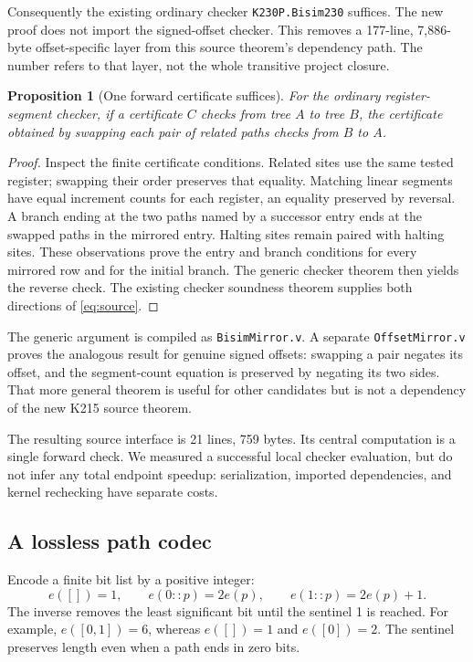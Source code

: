 \documentclass[11pt]{article}
\newtheorem{proposition}[theorem]{Proposition}
\theoremstyle{remark}\newtheorem{remark}[theorem]{Remark}
\newcommand{\code}[1]{\texttt{\small #1}}
\begin{document}
Consequently the existing ordinary checker \code{K230P.Bisim230} suffices. The new proof does not import the signed-offset checker. This removes a 177-line, 7,886-byte offset-specific layer from this source theorem's dependency path. The number refers to that layer, not the whole transitive project closure.

\begin{proposition}[One forward certificate suffices]
For the ordinary register-segment checker, if a certificate $C$ checks from tree $A$ to tree $B$, the certificate obtained by swapping each pair of related paths checks from $B$ to $A$.
\end{proposition}
\begin{proof}
Inspect the finite certificate conditions. Related sites use the same tested register; swapping their order preserves that equality. Matching linear segments have equal increment counts for each register, an equality preserved by reversal. A branch ending at the two paths named by a successor entry ends at the swapped paths in the mirrored entry. Halting sites remain paired with halting sites. These observations prove the entry and branch conditions for every mirrored row and for the initial branch. The generic checker theorem then yields the reverse check. The existing checker soundness theorem supplies both directions of \eqref{eq:source}.
\end{proof}

The generic argument is compiled as \code{BisimMirror.v}. A separate \code{OffsetMirror.v} proves the analogous result for genuine signed offsets: swapping a pair negates its offset, and the segment-count equation is preserved by negating its two sides. That more general theorem is useful for other candidates but is not a dependency of the new K215 source theorem.

The resulting source interface is 21 lines, 759 bytes. Its central computation is a single forward check. We measured a successful local checker evaluation, but do not infer any total endpoint speedup: serialization, imported dependencies, and kernel rechecking have separate costs.

\subsection{A lossless path codec}

Encode a finite bit list by a positive integer:
\[
 e([])=1,\qquad e(0::p)=2e(p),\qquad e(1::p)=2e(p)+1.
\]
The inverse removes the least significant bit until the sentinel 1 is reached. For example, $e([0,1])=6$, whereas $e([])=1$ and $e([0])=2$. The sentinel preserves length even when a path ends in zero bits.
\end{document}
